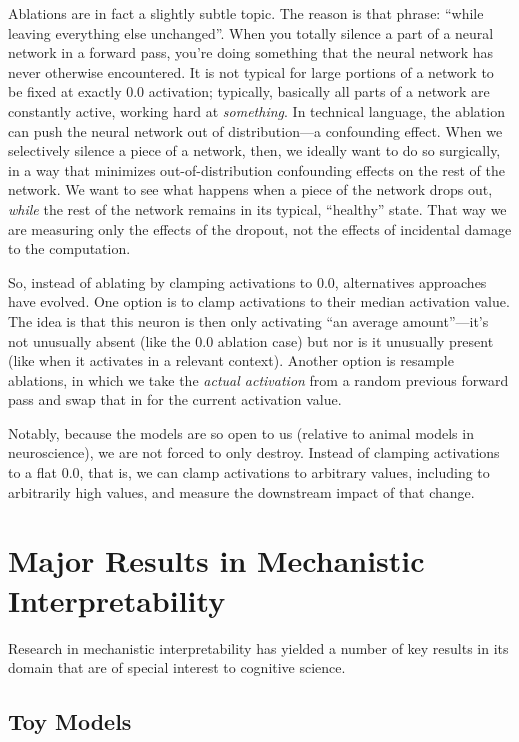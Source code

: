 Ablations are in fact a slightly subtle topic. The reason is that phrase:
``while leaving everything else unchanged''. When you totally silence a part of
a neural network in a forward pass, you're doing something that the neural
network has never otherwise encountered. It is not typical for large portions
of a network to be fixed at exactly $0.0$ activation; typically, basically all
parts of a network are constantly active, working hard at \emph{something}. In
technical language, the ablation can push the neural network out of
distribution---a confounding effect. When we selectively silence a piece of a
network, then, we ideally want to do so surgically, in a way that minimizes
out-of-distribution confounding effects on the rest of the network. We want to
see what happens when a piece of the network drops out, \emph{while} the rest
of the network remains in its typical, ``healthy'' state. That way we are
measuring only the effects of the dropout, not the effects of incidental damage
to the computation.

So, instead of ablating by clamping activations to $0.0$, alternatives
approaches have evolved. One option is to clamp activations to their median
activation value. The idea is that this neuron is then only activating ``an
average amount''---it's not unusually absent (like the $0.0$ ablation case) but
nor is it unusually present (like when it activates in a relevant context).
Another option is resample ablations, in which we take the \emph{actual
activation} from a random previous forward pass and swap that in for the
current activation value.

Notably, because the models are so open to us (relative to animal models in
neuroscience), we are not forced to only destroy. Instead of clamping
activations to a flat $0.0$, that is, we can clamp activations to arbitrary
values, including to arbitrarily high values, and measure the downstream impact
of that change.

\section{Major Results in Mechanistic Interpretability}

Research in mechanistic interpretability has yielded a number of key results in
its domain that are of special interest to cognitive science.

\subsection{Toy Models}

